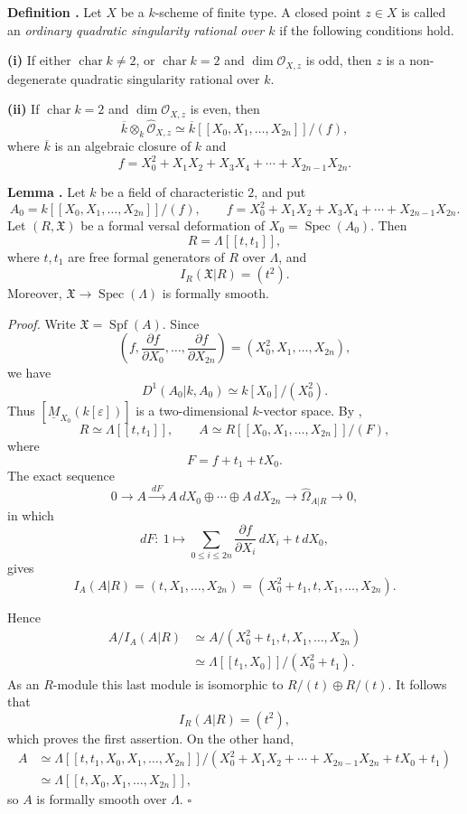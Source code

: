 
\par\medskip
\noindent\textbf{Definition .}
Let $X$ be a $k$-scheme of finite type. A closed point $z\in X$ is
called an \emph{ordinary quadratic singularity rational over $k$} if
the following conditions hold.

\smallskip
\noindent\textbf{(i)} If either $\operatorname{char}k\neq2$, or
$\operatorname{char}k=2$ and $\dim\mathcal O_{X,z}$ is odd, then $z$
is a non-degenerate quadratic singularity rational over $k$.

\smallskip
\noindent\textbf{(ii)} If $\operatorname{char}k=2$ and
$\dim\mathcal O_{X,z}$ is even, then
\[
\overline k\otimes_k\widehat{\mathcal O}_{X,z}
 \simeq
\overline k[[X_0,X_1,\ldots,X_{2n}]]/(f),
\]
where $\overline k$ is an algebraic closure of $k$ and
\[
f=X_0^2+X_1X_2+X_3X_4+\cdots+X_{2n-1}X_{2n}.
\]

\par\medskip
\noindent\textbf{Lemma .}
Let $k$ be a field of characteristic $2$, and put
\[
A_0=k[[X_0,X_1,\ldots,X_{2n}]]/(f),
\qquad
f=X_0^2+X_1X_2+X_3X_4+\cdots+X_{2n-1}X_{2n}.
\]
Let $(R,\mathfrak X)$ be a formal versal deformation of
$X_0=\operatorname{Spec}(A_0)$. Then
\[
R=\Lambda[[t,t_1]],
\]
where $t,t_1$ are free formal generators of $R$ over $\Lambda$, and
\[
I_R(\mathfrak X|R)=(t^2).
\]
Moreover,
$\mathfrak X\longrightarrow\operatorname{Spec}(\Lambda)$ is formally
smooth.

\smallskip
\noindent\textit{Proof.}
Write $\mathfrak X=\operatorname{Spf}(A)$. Since
\[
\left(f,\frac{\partial f}{\partial X_0},\ldots,
         \frac{\partial f}{\partial X_{2n}}\right)
=(X_0^2,X_1,\ldots,X_{2n}),
\]
we have
\[
D^1(A_0|k,A_0)\simeq k[X_0]/(X_0^2).
\]
Thus $[\underline M_{X_0}(k[\varepsilon])]$ is a two-dimensional
$k$-vector space. By ,
\[
R\simeq\Lambda[[t,t_1]],
\qquad
A\simeq R[[X_0,X_1,\ldots,X_{2n}]]/(F),
\]
where
\[
F=f+t_1+tX_0.
\]
The exact sequence
\[
0\longrightarrow A\xrightarrow{\ dF\ }
A\,dX_0\oplus\cdots\oplus A\,dX_{2n}
\longrightarrow\widehat\Omega_{A|R}\longrightarrow0,
\]
in which
\[
dF:\ 1\longmapsto
\sum_{0\leq i\leq2n}\frac{\partial f}{\partial X_i}\,dX_i
+t\,dX_0,
\]
gives
\[
I_A(A|R)
=(t,X_1,\ldots,X_{2n})
=(X_0^2+t_1,t,X_1,\ldots,X_{2n}).
\]


Hence
\[
\begin{aligned}
A/I_A(A|R)
&\simeq A/(X_0^2+t_1,t,X_1,\ldots,X_{2n})\\
&\simeq\Lambda[[t_1,X_0]]/(X_0^2+t_1).
\end{aligned}
\]
As an $R$-module this last module is isomorphic to
$R/(t)\oplus R/(t)$. It follows that
\[
I_R(A|R)=(t^2),
\]
which proves the first assertion. On the other hand,
\[
\begin{aligned}
A
&\simeq
\Lambda[[t,t_1,X_0,X_1,\ldots,X_{2n}]]/
 (X_0^2+X_1X_2+\cdots+X_{2n-1}X_{2n}+tX_0+t_1)\\
&\simeq\Lambda[[t,X_0,X_1,\ldots,X_{2n}]],
\end{aligned}
\]
so $A$ is formally smooth over $\Lambda$.
\hfill$\square$

